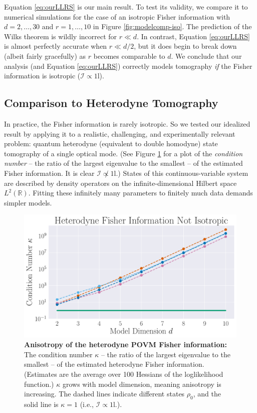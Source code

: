 \documentclass[aps,pra, twocolumn]{revtex4-1}
\newcommand{\reals}{\mathbb{R}}
\newcommand{\Id}{\mathbb{I}}
\def\Id{1\!\mathrm{l}}
\newcommand{\Fi}{\mathcal{I}}
\begin{document}
Equation \eqref{eq:ourLLRS} is our main result.  To test its validity, we compare it to numerical simulations for the case of an isotropic Fisher information
with $d=2,\ldots,30$ and $r=1,\ldots,10$ in Figure \ref{fig:modelcomp-iso}.  The prediction of the Wilks theorem is wildly incorrect for $r\ll d$. In contrast, Equation \eqref{eq:ourLLRS} is almost perfectly accurate when $r \ll d/2$, but it does begin to break down (albeit fairly gracefully) as $r$ becomes comparable to $d$.  We conclude that our analysis (and Equation \eqref{eq:ourLLRS}) correctly models tomography \emph{if} the Fisher information is isotropic ($\Fi \propto \Id$).


\subsection{Comparison to Heterodyne Tomography}
\label{sec:heterotomo}
In practice, the Fisher information is rarely isotropic.  So we tested our idealized result by applying it to a realistic, challenging, and experimentally relevant problem: quantum heterodyne (equivalent to double homodyne) state tomography \cite{Lvovsky2001a, Bertrand1987, Leonhardt1995, Lvovsky2009} of a single optical mode.  (See Figure \ref{fig:fish_condition} for a plot of the \emph{condition number} -- the ratio of the largest eigenvalue to the smallest -- of the estimated Fisher information. It is clear $\mathcal{I} \not \propto \Id$.) States of this continuous-variable system are described by density operators on the infinite-dimensional Hilbert space $L^2(\reals)$.  Fitting these infinitely many parameters to finitely much data demands simpler models.

\begin{figure}
  \includegraphics[width=.9\columnwidth]{Images/Figure_10.pdf}
 \caption{\textbf{Anisotropy of the heterodyne POVM Fisher information:} The condition number $\kappa$ -- the ratio of the largest eigenvalue to the smallest -- of the estimated heterodyne Fisher information. (Estimates are the average over 100 Hessians of the loglikelihood function.) $\kappa$ grows with model dimension, meaning anisotropy is increasing.  The dashed lines indicate different states $\rho_{0}$, and the solid line is $\kappa = 1$ (i.e., $\mathcal{I} \propto \Id$.).}
\label{fig:fish_condition}
\end{figure}
\end{document}
